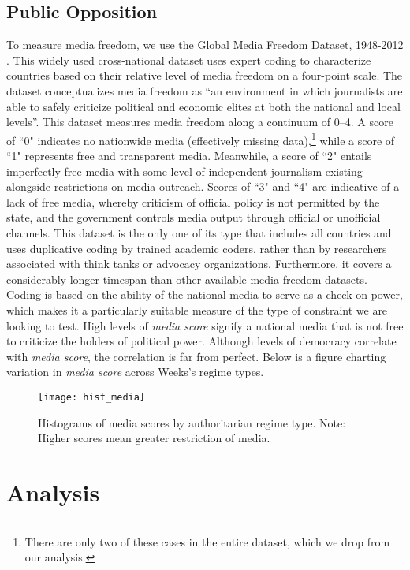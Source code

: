 \documentclass[12pt]{article}
\begin{document}
\subsection{Public Opposition}

\par To measure media freedom, we use the Global Media Freedom Dataset, 1948-2012 \parencites{whitten-woodring:2015}. This widely used cross-national dataset uses expert coding to characterize countries based on their relative level of media freedom on a four-point scale. The dataset conceptualizes media freedom as ``an environment in which journalists are able to safely criticize political and economic elites at both the national and local levels''\parencite{whitten-woodring:2015}. This dataset measures media freedom along a continuum of 0--4. A score of ``0" indicates no nationwide media (effectively missing data),\footnote{There are only two of these cases in the entire dataset, which we drop from our analysis.} while a score of ``1" represents free and transparent media. Meanwhile, a score of ``2" entails imperfectly free media with some level of independent journalism existing alongside restrictions on media outreach. Scores of ``3" and ``4" are indicative of a lack of free media, whereby criticism of official policy is not permitted by the state, and the government controls media output through official or unofficial channels. This dataset is the only one of its type that includes all countries and uses duplicative coding by trained academic coders, rather than by researchers associated with think tanks or advocacy organizations. Furthermore, it covers a considerably longer timespan than other available media freedom datasets. Coding is based on the ability of the national media to serve as a check on power, which makes it a particularly suitable measure of the type of constraint we are looking to test. High levels of \textit{media score} signify a national media that is not free to criticize the holders of political power. Although levels of democracy correlate with \textit{media score}, the correlation is far from perfect. Below is a figure charting variation in \textit{media score} across Weeks's regime types.   

\begin{figure}
	\texttt{[image: hist\_media]}
	\caption{Histograms of media scores by authoritarian regime type. Note: Higher scores mean greater restriction of media.}
\end{figure}

\section{Analysis}
\end{document}
